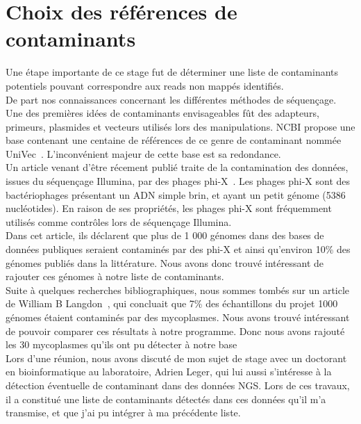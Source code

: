 \documentclass[a4paper,12pt]{article}
\begin{document}
\clearpage


\section{Choix des références de contaminants}

Une étape importante de ce stage fut de déterminer une liste de contaminants potentiels pouvant correspondre aux reads non mappés identifiés.\\ 

De part nos connaissances concernant les différentes méthodes de séquençage. Une des premières idées de contaminants envisageables fût des adapteurs, primeurs, plasmides et vecteurs utilisés lors des manipulations. NCBI propose une base contenant une centaine de références de ce genre de contaminant nommée UniVec~\cite{UniVec}. L'inconvénient majeur de cette base est sa redondance. \\

Un article venant d'être récement publié traite de la contamination des données, issues du séquençage Illumina, par des phages phi-X~\cite{phiX}. Les phages phi-X sont des bactériophages présentant un ADN simple brin, et ayant un petit génome (5386 nucléotides). En raison de ses propriétés, les phages phi-X sont fréquemment utilisés comme contrôles lors de séquençage Illumina. \\ 
Dans cet article, ils déclarent que plus de 1 000 génomes dans des bases de données publiques seraient contaminés par des phi-X et ainsi qu'environ 10\% des génomes publiés dans la littérature. Nous avons donc trouvé intéressant de rajouter ces génomes à notre liste de contaminants.\\

Suite à quelques recherches bibliographiques, nous sommes tombés sur un article de William B Langdon~\cite{mycoplasme}, qui concluait que 7\% des échantillons du projet 1000 génomes étaient contaminés par des mycoplasmes. Nous avons trouvé intéressant de pouvoir comparer ces résultats à notre programme. Donc nous avons rajouté les 30 mycoplasmes qu'ils ont pu détecter à notre base \\

Lors d'une réunion, nous avons discuté de mon sujet de stage avec un doctorant en bioinformatique au laboratoire, Adrien Leger, qui lui aussi s'intéresse à la détection éventuelle de contaminant dans des données NGS. Lors de ces travaux, il a constitué une liste de contaminants détectés dans ces données qu'il m'a transmise, et que j'ai pu intégrer à ma précédente liste.\\
\end{document}
